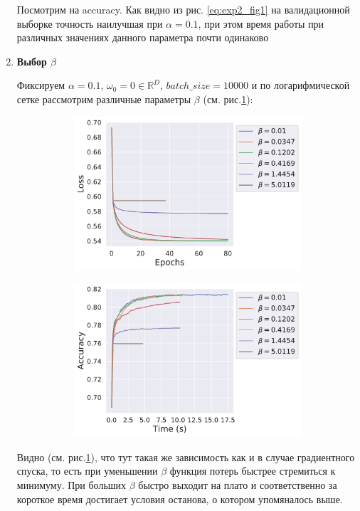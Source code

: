 \begin{enumerate}
	Посмотрим на accuracy. Как видно из рис. \ref{eq:exp2_fig1} на валидационной выборке точность наилучшая при $\alpha=0.1$, при этом время работы при различных значениях данного параметра почти одинаково

	\item {\bfseries  Выбор $\beta$}
	
	Фиксируем $\alpha = 0.1$, $\omega_0 = 0 \in \mathbb{R}^D$, $batch\_size=10000$ и по логарифмической сетке рассмотрим различные параметры $\beta$ (см. рис.\ref{eq:exp2_fig2}):
    \begin{figure}[h]
        \begin{subfigure}{.5\textwidth}
            \centering
            \includegraphics[width=\linewidth]{./experiment2/beta/sgd_loss__iters.pdf}
            \caption{}
        \end{subfigure}%
        \begin{subfigure}{.5\textwidth}
            \centering
            \includegraphics[width=\linewidth]{./experiment2/beta/sgd_acc_time.pdf}
            \caption{}
        \end{subfigure}
    \caption{}\label{eq:exp2_fig2}
    \end{figure}
	Видно (см. рис.\ref{eq:exp2_fig2}), что тут такая же зависимость как и в случае градиентного спуска, то есть при уменьшении $\beta$ функция потерь быстрее стремиться к минимуму. При больших $\beta$ быстро выходит на плато и соответственно за короткое время достигает условия останова, о котором упомяналось выше.


\end{enumerate}
